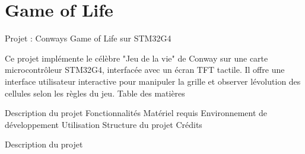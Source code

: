 \chapter{Game of Life}
\hypertarget{index}{}\label{index}
\label{index_md_README}%
%
 Projet \+: Conway\textquotesingle{}s Game of Life sur STM32\+G4

Ce projet implémente le célèbre "{}\+Jeu de la vie"{} de Conway sur une carte microcontrôleur STM32\+G4, interfacée avec un écran TFT tactile. Il offre une interface utilisateur interactive pour manipuler la grille et observer l\textquotesingle{}évolution des cellules selon les règles du jeu. Table des matières \begin{DoxyVerb}Description du projet
Fonctionnalités
Matériel requis
Environnement de développement
Utilisation
Structure du projet
Crédits
\end{DoxyVerb}

\begin{DoxyEnumerate}
\item Description du projet
\end{DoxyEnumerate}

